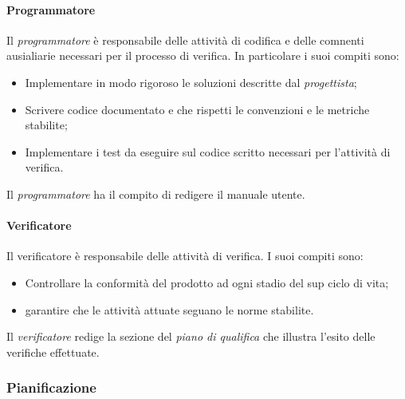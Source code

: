 			\paragraph{Programmatore}
				Il \textit{programmatore} è responsabile delle attività di codifica e delle comnenti ausialiarie necessari per il processo di verifica.
				In particolare i suoi compiti sono:
				\begin{itemize}
					\item Implementare in modo rigoroso le soluzioni descritte dal \textit{progettista};
					\item Scrivere codice documentato e che rispetti le convenzioni e le metriche stabilite;
					\item Implementare i test da eseguire sul codice scritto necessari per l'attività di verifica.
				\end{itemize}
				Il \textit{programmatore}  ha il compito di redigere il manuale utente. 
			\paragraph{Verificatore}
				Il verificatore è responsabile delle attività di verifica.
				I suoi compiti sono:
				\begin{itemize}
					\item Controllare la conformità del prodotto ad ogni stadio del sup ciclo di vita;
					\item garantire che le attività attuate seguano le norme stabilite.
				\end{itemize}
				Il \textit{verificatore} redige la sezione del \textit{piano di qualifica} che illustra l'esito delle verifiche effettuate.
	
	
	\subsubsection{Pianificazione}
